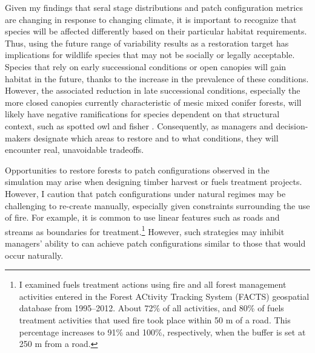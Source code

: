 Given my findings that seral stage distributions and patch configuration metrics are changing in response to changing climate, it is important to recognize that species will be affected differently based on their particular habitat requirements. Thus, using the future range of variability results as a restoration target has implications for wildlife species that may not be socially or legally acceptable. Species that rely on early successional conditions or open canopies will gain habitat in the future, thanks to the increase in the prevalence of these conditions. However, the associated reduction in late successional conditions, especially the more closed canopies currently characteristic of mesic mixed conifer forests, will likely have negative ramifications for species dependent on that structural context, such as spotted owl and fisher \citep{SNEP1996b}. Consequently, as managers and decision-makers designate which areas to restore and to what conditions, they will encounter real, unavoidable tradeoffs.

Opportunities to restore forests to patch configurations observed in the simulation may arise when designing timber harvest or fuels treatment projects. However, I caution that patch configurations under natural regimes may be challenging to re-create manually, especially given constraints surrounding the use of fire. For example, it is common to use linear features such as roads and streams as boundaries for treatment.\footnote{I examined fuels treatment actions using fire and all forest management activities entered in the Forest ACtivity Tracking System (FACTS) geospatial database from 1995--2012. About 72\% of all activities, and 80\% of fuels treatment activities that used fire took place within 50 m of a road. This percentage increases to 91\% and 100\%, respectively, when the buffer is set at 250 m from a road.} However, such strategies may inhibit managers' ability to can achieve patch configurations similar to those that would occur naturally.

